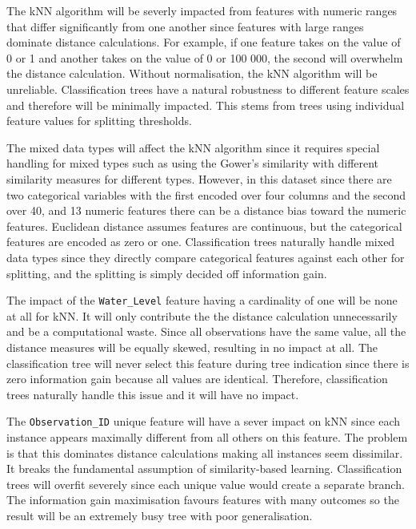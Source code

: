 \documentclass[10pt, conference]{IEEEtran}
\begin{document}
The kNN algorithm will be severly impacted from features with numeric ranges that differ significantly from one another since features with large ranges dominate distance calculations. For example, if one feature takes on the value of 0 or 1 and another takes on the value of 0 or 100 000, the second will overwhelm the distance calculation. Without normalisation, the kNN algorithm will be unreliable. Classification trees have a natural robustness to different feature scales and therefore will be minimally impacted. This stems from trees using individual feature values for splitting thresholds.

The mixed data types will affect the kNN algorithm since it requires special handling for mixed types such as using the Gower's similarity with different similarity measures for different types. However, in this dataset since there are two categorical variables with the first encoded over four columns and the second over 40, and 13 numeric features there can be a distance bias toward the numeric features. Euclidean distance assumes features are continuous, but the categorical features are encoded as zero or one. Classification trees naturally handle mixed data types since they directly compare categorical features against each other for splitting, and the splitting is simply decided off information gain.

The impact of the \texttt{Water\_Level} feature having a cardinality of one will be none at all for kNN. It will only contribute the the distance calculation unnecessarily and be a computational waste. Since all observations have the same value, all the distance measures will be equally skewed, resulting in no impact at all. The classification tree will never select this feature during tree indication since there is zero information gain because all values are identical. Therefore, classification trees naturally handle this issue and it will have no impact.

The \texttt{Observation\_ID} unique feature will have a sever impact on kNN since each instance appears maximally different from all others on this feature. The problem is that this dominates distance calculations making all instances seem dissimilar. It breaks the fundamental assumption of similarity-based learning. Classification trees will overfit severely since each unique value would create a separate branch. The information gain maximisation favours features with many outcomes so the result will be an extremely busy tree with poor generalisation.
\end{document}
